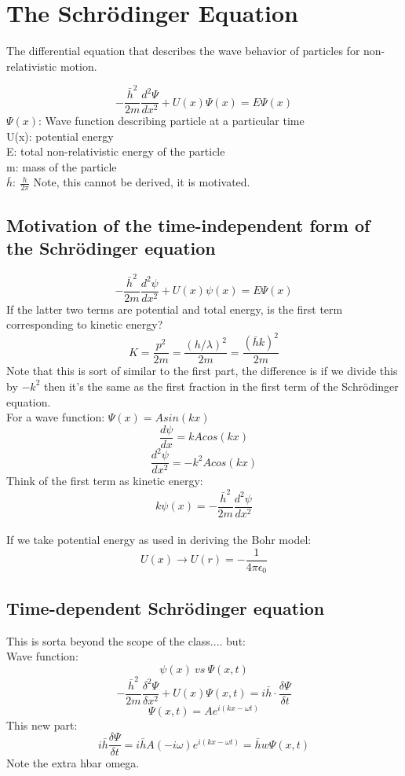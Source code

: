 \documentclass[class=article,crop=false]{standalone}
\begin{document}
\section{The Schrödinger Equation}
The differential equation that describes the wave behavior of particles for non-relativistic motion.

\begin{result}
	$$ -\frac{\bar{h}^2}{2m} \frac{d^2\Psi}{dx^2} + U(x)\Psi(x) = E\Psi(x) $$
	$\Psi(x)$: Wave function describing particle at a particular time\\
	U(x): potential energy\\
	E: total non-relativistic energy of the particle\\
	m: mass of the particle \\
	$\bar{h}:\ \frac{h}{2\pi}$
	Note, this cannot be derived, it is motivated.
\end{result}

\subsection{Motivation of the time-independent form of the Schrödinger equation}
$$ -\frac{\bar{h}^2}{2m} \frac{d^2\psi}{dx^2} + U(x)\psi(x) = E\Psi(x) $$
If the latter two terms are potential and total energy, is the first term corresponding to kinetic energy? \\

$$ K = \frac{p^2}{2m} = \frac{(h/\lambda)^2}{2m} = \frac{(\bar{h}k)^2}{2m} $$
Note that this is sort of similar to the first part, the difference is if we divide this by $-k^2$ then it's the same as the first fraction in the first term of the Schrödinger equation.\\


For a wave function: $\Psi(x) = A sin(kx)$
$$ \frac{d\psi}{dx} = kA cos(kx) $$
$$ \frac{d^2\psi}{dx^2} = -k^2 A cos(kx) $$
Think of the first term as kinetic energy:
$$ k\psi(x) = -\frac{\bar{h}^2}{2m} \frac{d^2\psi}{dx^2} $$
\\

If we take potential energy as used in deriving the Bohr model:
$$ U(x) \rightarrow U(r) = -\frac{1}{4\pi\epsilon_0} $$

\subsection{Time-dependent Schrödinger equation}
This is sorta beyond the scope of the class.... but: \\
Wave function:
$$ \psi(x)\ vs\ \Psi(x,t) $$
$$ -\frac{\bar{h}^2}{2m} \frac{\delta^2\Psi}{\delta x^2} + U(x) \Psi(x,t) = i\bar{h} \cdot \frac{\delta\Psi}{\delta t} $$
$$ \Psi(x,t) = A e^{i(kx - \omega t)} $$
This new part:
$$ i\bar{h} \frac{\delta \Psi}{\delta t} = i\bar{h} A(-i\omega)e^{i(kx-\omega t)} = \bar{h} w \Psi(x, t) $$
Note the extra hbar omega.
\end{document}
